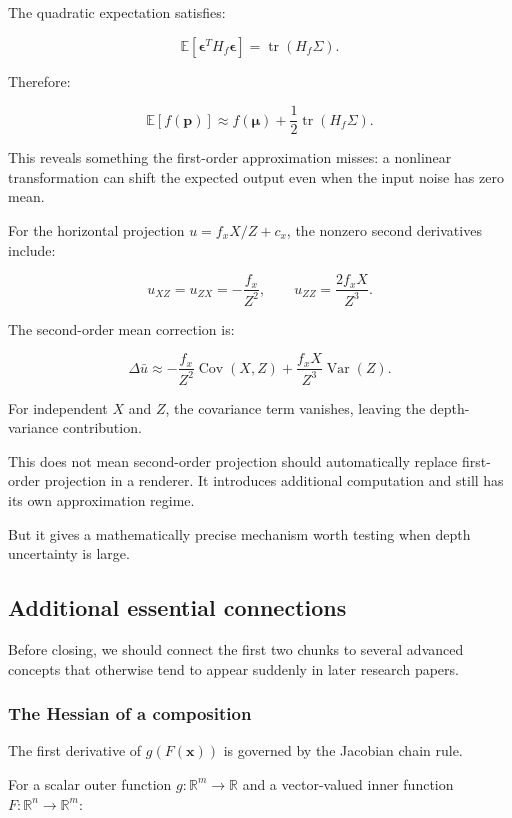 The quadratic expectation satisfies:

\[
\mathbb E[ \boldsymbol\epsilon^TH_f\boldsymbol\epsilon ] = \operatorname{tr}(H_f\Sigma).
\]

Therefore:

\[
\boxed{ \mathbb E[f(\mathbf p)] \approx f(\boldsymbol\mu)+ \frac12\operatorname{tr}(H_f\Sigma) }.
\]

This reveals something the first-order approximation misses: a nonlinear transformation can shift the expected output even when the input noise has zero mean.

For the horizontal projection \(u=f_xX/Z+c_x\), the nonzero second derivatives include:

\[
u_{XZ}=u_{ZX}=-\frac{f_x}{Z^2}, \qquad u_{ZZ}=\frac{2f_xX}{Z^3}.
\]

The second-order mean correction is:

\[
\boxed{ \Delta\bar u \approx -\frac{f_x}{Z^2}\operatorname{Cov}(X,Z) + \frac{f_xX}{Z^3}\operatorname{Var}(Z) }.
\]

For independent \(X\) and \(Z\), the covariance term vanishes, leaving the depth-variance contribution.

This does not mean second-order projection should automatically replace first-order projection in a renderer. It introduces additional computation and still has its own approximation regime.

But it gives a mathematically precise mechanism worth testing when depth uncertainty is large.

\subsection{Additional essential connections}\label{02-foundations-ii-ch021-additional-essential-connections}

Before closing, we should connect the first two chunks to several advanced concepts that otherwise tend to appear suddenly in later research papers.

\subsubsection{The Hessian of a composition}\label{02-foundations-ii-ch021-the-hessian-of-a-composition}

The first derivative of \(g(F(\mathbf x))\) is governed by the Jacobian chain rule.

For a scalar outer function \(g:\mathbb R^m\to\mathbb R\) and a vector-valued inner function \(F:\mathbb R^n\to\mathbb R^m\):

